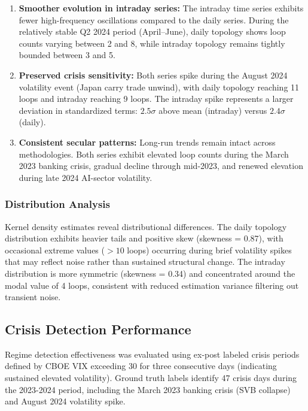 \begin{enumerate}
\item \textbf{Smoother evolution in intraday series:} The intraday time series exhibits fewer high-frequency oscillations compared to the daily series. During the relatively stable Q2 2024 period (April--June), daily topology shows loop counts varying between 2 and 8, while intraday topology remains tightly bounded between 3 and 5.

\item \textbf{Preserved crisis sensitivity:} Both series spike during the August 2024 volatility event (Japan carry trade unwind), with daily topology reaching 11 loops and intraday reaching 9 loops. The intraday spike represents a larger deviation in standardized terms: $2.5\sigma$ above mean (intraday) versus $2.4\sigma$ (daily).

\item \textbf{Consistent secular patterns:} Long-run trends remain intact across methodologies. Both series exhibit elevated loop counts during the March 2023 banking crisis, gradual decline through mid-2023, and renewed elevation during late 2024 AI-sector volatility.
\end{enumerate}

\subsubsection{Distribution Analysis}

Kernel density estimates reveal distributional differences. The daily topology distribution exhibits heavier tails and positive skew (skewness = 0.87), with occasional extreme values ($>10$ loops) occurring during brief volatility spikes that may reflect noise rather than sustained structural change. The intraday distribution is more symmetric (skewness = 0.34) and concentrated around the modal value of 4 loops, consistent with reduced estimation variance filtering out transient noise.

\subsection{Crisis Detection Performance}

Regime detection effectiveness was evaluated using ex-post labeled crisis periods defined by CBOE VIX exceeding 30 for three consecutive days (indicating sustained elevated volatility). Ground truth labels identify 47 crisis days during the 2023-2024 period, including the March 2023 banking crisis (SVB collapse) and August 2024 volatility spike.

